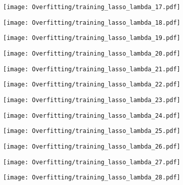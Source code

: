 \documentclass[xcolor=pdftex,dvipsnames,table]{beamer}
\begin{document}
\frame
{
	\begin{center}
		\texttt{[image: Overfitting/training\_lasso\_lambda\_17.pdf]}
	\end{center}
}

\frame
{
	\begin{center}
		\texttt{[image: Overfitting/training\_lasso\_lambda\_18.pdf]}
	\end{center}
}

\frame
{
	\begin{center}
		\texttt{[image: Overfitting/training\_lasso\_lambda\_19.pdf]}
	\end{center}
}

\frame
{
	\begin{center}
		\texttt{[image: Overfitting/training\_lasso\_lambda\_20.pdf]}
	\end{center}
}

\frame
{
	\begin{center}
		\texttt{[image: Overfitting/training\_lasso\_lambda\_21.pdf]}
	\end{center}
}

\frame
{
	\begin{center}
		\texttt{[image: Overfitting/training\_lasso\_lambda\_22.pdf]}
	\end{center}
}

\frame
{
	\begin{center}
		\texttt{[image: Overfitting/training\_lasso\_lambda\_23.pdf]}
	\end{center}
}

\frame
{
	\begin{center}
		\texttt{[image: Overfitting/training\_lasso\_lambda\_24.pdf]}
	\end{center}
}

\frame
{
	\begin{center}
		\texttt{[image: Overfitting/training\_lasso\_lambda\_25.pdf]}
	\end{center}
}

\frame
{
	\begin{center}
		\texttt{[image: Overfitting/training\_lasso\_lambda\_26.pdf]}
	\end{center}
}

\frame
{
	\begin{center}
		\texttt{[image: Overfitting/training\_lasso\_lambda\_27.pdf]}
	\end{center}
}

\frame
{
	\begin{center}
		\texttt{[image: Overfitting/training\_lasso\_lambda\_28.pdf]}
	\end{center}
}
\end{document}
